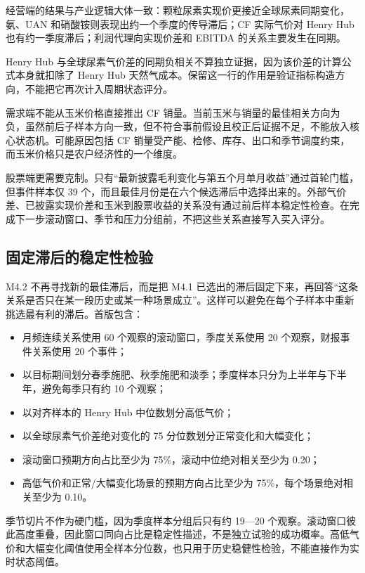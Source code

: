 \documentclass[11pt,a4paper]{ctexart}
\begin{document}
经营端的结果与产业逻辑大体一致：颗粒尿素实现价更接近全球尿素同期变化，氨、UAN 和硝酸铵则表现出约一个季度的传导滞后；CF 实际气价对 Henry Hub 也有约一季度滞后；利润代理向实现价差和 EBITDA 的关系主要发生在同期。

Henry Hub 与全球尿素气价差的同期负相关不算独立证据，因为该价差的计算公式本身就扣除了 Henry Hub 天然气成本。保留这一行的作用是验证指标构造方向，不能把它再次计入周期状态评分。

需求端不能从玉米价格直接推出 CF 销量。当前玉米与销量的最佳相关方向为负，虽然前后子样本方向一致，但不符合事前假设且校正后证据不足，不能放入核心状态机。可能原因包括 CF 销量受产能、检修、库存、出口和季节调度约束，而玉米价格只是农户经济性的一个维度。

股票端更需要克制。只有“最新披露毛利变化与第五个月单月收益”通过首轮门槛，但事件样本仅 39 个，而且最佳月份是在六个候选滞后中选择出来的。外部气价差、已披露实现价差和玉米到股票收益的关系没有通过前后样本稳定性检查。在完成下一步滚动窗口、季节和压力分组前，不把这些关系直接写入买入评分。

\subsection{固定滞后的稳定性检验}

M4.2 不再寻找新的最佳滞后，而是把 M4.1 已选出的滞后固定下来，再回答“这条关系是否只在某一段历史或某一种场景成立”。这样可以避免在每个子样本中重新挑选最有利的滞后。首版包含：

\begin{itemize}
  \item 月频连续关系使用 60 个观察的滚动窗口，季度关系使用 20 个观察，财报事件关系使用 20 个事件；
  \item 以目标期间划分春季施肥、秋季施肥和淡季；季度样本只分为上半年与下半年，避免每季只有约 10 个观察；
  \item 以对齐样本的 Henry Hub 中位数划分高低气价；
  \item 以全球尿素气价差绝对变化的 75 分位数划分正常变化和大幅变化；
  \item 滚动窗口预期方向占比至少为 75\%，滚动中位绝对相关至少为 0.20；
  \item 高低气价和正常/大幅变化场景的预期方向占比至少为 75\%，每个场景绝对相关至少为 0.10。
\end{itemize}

季节切片不作为硬门槛，因为季度样本分组后只有约 19---20 个观察。滚动窗口彼此高度重叠，因此窗口同向占比是稳定性描述，不是独立试验的成功概率。高低气价和大幅变化阈值使用全样本分位数，也只用于历史稳健性检验，不能直接作为实时状态阈值。
\end{document}

